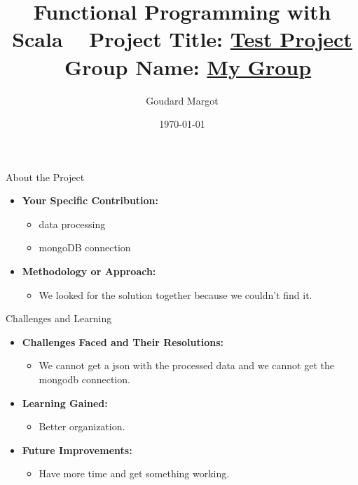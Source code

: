 \documentclass[serif, aspectratio=169]{beamer}
\title[Project Presentation]{Functional Programming with Scala \ { \large Project Title: \underline{ Test Project \hspace{2cm}}}\ {\small Group Name: \underline{ My Group \hspace{2cm} }}}
\author{Goudard Margot}
\institute{ IG5_Polytech}
\date{\small \today}
\begin{document}
\begin{frame}
    \titlepage
\end{frame}

\begin{frame}{About the Project}
    \begin{itemize}
        \item \textbf{Your Specific Contribution:}
        \begin{itemize}
            \item data processing
            \item mongoDB connection
        \end{itemize}
        \medskip
        \item \textbf{Methodology or Approach:}
        \begin{itemize}
            \item We looked for the solution together because we couldn't find it.
        \end{itemize}

    \end{itemize}
\end{frame}

\begin{frame}{Challenges and Learning}
    \begin{itemize}
        \item \textbf{Challenges Faced and Their Resolutions:}
        \begin{itemize}
            \item We cannot get a json with the processed data and we cannot get the mongodb connection.

        \end{itemize}
        \medskip
        \item \textbf{Learning Gained:}
        \begin{itemize}
            \item Better organization.
        \end{itemize}
        \medskip
        \item \textbf{Future Improvements:}
        \begin{itemize}
            \item Have more time and get something working.
        \end{itemize}
    \end{itemize}
\end{frame}
\end{document}
